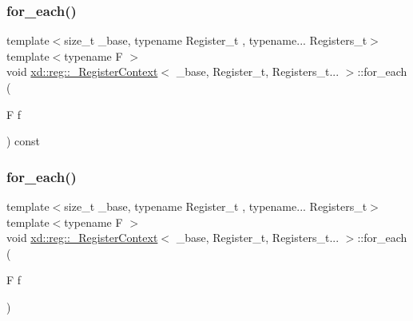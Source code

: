 \subsubsection{\texorpdfstring{for\+\_\+each()}{for\_each()}\hspace{0.1cm}{\footnotesize\ttfamily [1/2]}}
{\footnotesize\ttfamily template$<$size\+\_\+t \+\_\+base, typename Register\+\_\+t , typename... Registers\+\_\+t$>$ \\
template$<$typename F $>$ \\
void \mbox{\hyperlink{classxd_1_1reg_1_1___register_context}{xd\+::reg\+::\+\_\+\+Register\+Context}}$<$ \+\_\+base, Register\+\_\+t, Registers\+\_\+t... $>$\+::for\+\_\+each (\begin{DoxyParamCaption}\item[{F}]{f }\end{DoxyParamCaption}) const\hspace{0.3cm}{\ttfamily [inline]}}

\mbox{\label{classxd_1_1reg_1_1___register_context_3_01__base_00_01_register__t_00_01_registers__t_8_8_8_01_4_affaf2c446157baaca2839c604f7de614}} 
\subsubsection{\texorpdfstring{for\+\_\+each()}{for\_each()}\hspace{0.1cm}{\footnotesize\ttfamily [2/2]}}
{\footnotesize\ttfamily template$<$size\+\_\+t \+\_\+base, typename Register\+\_\+t , typename... Registers\+\_\+t$>$ \\
template$<$typename F $>$ \\
void \mbox{\hyperlink{classxd_1_1reg_1_1___register_context}{xd\+::reg\+::\+\_\+\+Register\+Context}}$<$ \+\_\+base, Register\+\_\+t, Registers\+\_\+t... $>$\+::for\+\_\+each (\begin{DoxyParamCaption}\item[{F}]{f }\end{DoxyParamCaption})\hspace{0.3cm}{\ttfamily [inline]}}

